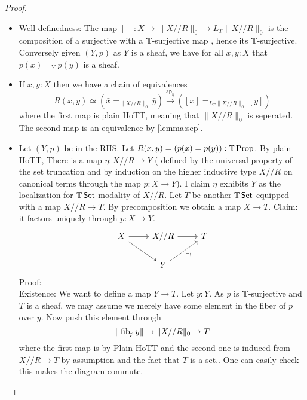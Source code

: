 \begin{proof}
	\begin{itemize}
		\item Well-definedness: The map $[\_] : X \to \|X // R\|_0 \to L_T \|X // R\|_0$ is the composition of a surjective with a $\mathbb{T}$-surjective map \todocite, hence its $\mathbb{T}$-surjective. \\
		Conversely given $(Y,p)$ as $Y$ is a sheaf, we have for all $x,y : X$ that $p(x) =_Y p(y)$ is a sheaf.
		\item If $x,y : X$ then we have a chain of equivalences 
		\[
		R(x,y) \simeq (\bar x =_{\|X//R\|_0} \bar y) \overset{\mathsf{ap}_\eta}{\to} ([x] =_{L_T\|X//R\|_0} [y])
		\]
		where the first map is plain HoTT, meaning that $\|X//R\|_0$ is seperated. The second map is an equivalence by \ref{lemma:sep}. %
		\item Let $(Y,p)$ be in the RHS. Let $R(x,y) = (p(x)=p(y)) : \mathbb{T} \operatorname{Prop}$. By plain HoTT, There is a map $\eta :  X // R  \to Y$ ( defined by the universal property of the set truncation and by induction on the higher inductive type $ X // R$ on canonical terms through the map $p : X \to Y$). I claim $\eta$ exhibits $Y$ as the localization for $\mathbb{T} \operatorname{\mathsf {Set}}$-modality of $X // R$. Let $T$ be another $\mathbb{T} \operatorname{\mathsf {Set}}$ equipped with a map $X // R  \to T$. By precomposition we obtain a map $X \to T$. 
		Claim: it factors uniquely through $p : X \to Y$. 
		\[\begin{tikzcd}
			X & {X // R} & T \\
			& Y
			\arrow[from=1-1, to=1-2]
			\arrow[from=1-1, to=2-2]
			\arrow[from=1-2, to=1-3]
			\arrow["{\exists!}"', dashed, from=2-2, to=1-3]
		\end{tikzcd}\]
		Proof: \\
		Existence: We want to define a map $Y \to T$. Let $y : Y$. As $p$ is $\mathbb{T}$-surjective and $T$ is a sheaf, we may assume we merely have some element in the fiber of $p$ over $y$. Now push this element through     
		\[\|\operatorname{fib}_p y\| \to \|X // R\|_0 \to T\]
		where the first map is by Plain HoTT and the second one is induced from $X // R \to T$ by assumption and the fact that $T$ is a set.. One can easily check this makes the diagram commute.

\end{itemize}
\end{proof}
